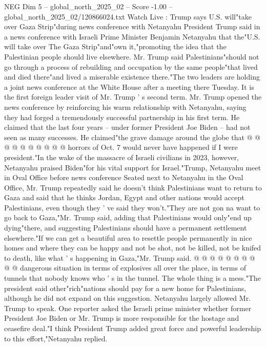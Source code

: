\begin{textsample}{NEG Dim 5 – global\_north\_2025\_02 – Score -1.00 – global\_north\_2025\_02/120866024.txt}  \label{ex:f5_neg_123}
Watch Live : Trump says U.S. will"take over Gaza Strip"during news conference with Netanyahu President Trump said in a news conference with Israeli Prime Minister Benjamin Netanyahu that the"U.S. will take over The Gaza Strip"and"own it,"promoting the idea that the Palestinian people should live elsewhere.
Mr.
Trump said Palestinians"should not go through a process of rebuilding and occupation by the same people"that lived and died there"and lived a miserable existence there."The two leaders are holding a joint news conference at the White House after a meeting there Tuesday.
It is the first foreign leader visit of Mr.
Trump ' s second term.
Mr.
Trump opened the news conference by reinforcing his warm relationship with Netanyahu, saying they had forged a tremendously successful partnership in his first term.
He claimed that the last four years -- under former President Joe Biden -- had not seen as many successes.
He claimed"the grave damage around the globe that @ @ @ @ @ @ @ @ @ @ horrors of Oct. 7 would never have happened if I were president."In the wake of the massacre of Israeli civilians in 2023, however, Netanyahu praised Biden"for his vital support for Israel."Trump, Netanyahu meet in Oval Office before news conference Seated next to Netanyahu in the Oval Office, Mr.
Trump repeatedly said he doesn't think Palestinians want to return to Gaza and said that he thinks Jordan, Egypt and other nations would accept Palestinians, even though they ' ve said they won't."They are not gon na want to go back to Gaza,"Mr.
Trump said, adding that Palestinians would only"end up dying"there, and suggesting Palestinians should have a permanent settlement elsewhere."If we can get a beautiful area to resettle people permanently in nice homes and where they can be happy and not be shot, not be killed, not be knifed to death, like what ' s happening in Gaza,"Mr.
Trump said. @ @ @ @ @ @ @ @ @ @ dangerous situation in terms of explosives all over the place, in terms of tunnels that nobody knows who ' s in the tunnel.
The whole thing is a mess."The president said other"rich"nations should pay for a new home for Palestinians, although he did not expand on this suggestion.
Netanyahu largely allowed Mr.
Trump to speak.
One reporter asked the Israeli prime minister whether former President Joe Biden or Mr.
Trump is more responsible for the hostage and ceasefire deal."I think President Trump added great force and powerful leadership to this effort,"Netanyahu replied.

\end{textsample}
